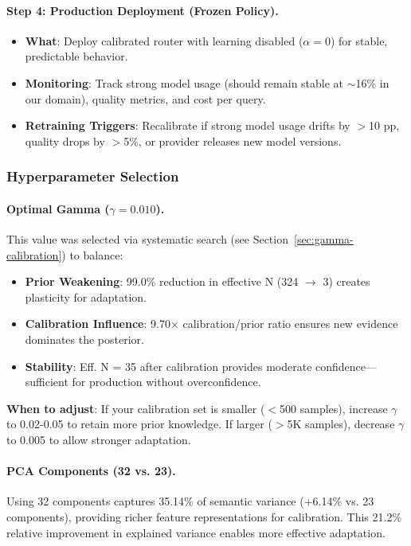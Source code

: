 \paragraph{Step 4: Production Deployment (Frozen Policy).}
\begin{itemize}
    \item \textbf{What}: Deploy calibrated router with learning disabled ($\alpha=0$) for stable, predictable behavior.
    \item \textbf{Monitoring}: Track strong model usage (should remain stable at $\sim$16\% in our domain), quality metrics, and cost per query.
    \item \textbf{Retraining Triggers}: Recalibrate if strong model usage drifts by $>$10 pp, quality drops by $>$5\%, or provider releases new model versions.
\end{itemize}

\subsubsection{Hyperparameter Selection}

\paragraph{Optimal Gamma ($\gamma=0.010$).} This value was selected via systematic search (see Section~\ref{sec:gamma-calibration}) to balance:
\begin{itemize}
    \item \textbf{Prior Weakening}: 99.0\% reduction in effective N (324 $\rightarrow$ 3) creates plasticity for adaptation.
    \item \textbf{Calibration Influence}: 9.70× calibration/prior ratio ensures new evidence dominates the posterior.
    \item \textbf{Stability}: Eff. N = 35 after calibration provides moderate confidence—sufficient for production without overconfidence.
\end{itemize}

\textbf{When to adjust}: If your calibration set is smaller ($<$500 samples), increase $\gamma$ to 0.02-0.05 to retain more prior knowledge. If larger ($>$5K samples), decrease $\gamma$ to 0.005 to allow stronger adaptation.

\paragraph{PCA Components (32 vs. 23).} Using 32 components captures 35.14\% of semantic variance (+6.14\% vs. 23 components), providing richer feature representations for calibration. This 21.2\% relative improvement in explained variance enables more effective adaptation.

